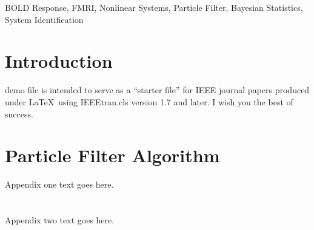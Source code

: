 \documentclass[journal]{./IEEEtran}
\begin{document}
\begin{IEEEkeywords}
BOLD Response, FMRI, Nonlinear Systems, Particle Filter, Bayesian Statistics, System Identification
\end{IEEEkeywords}

%
\IEEEpeerreviewmaketitle


\section{Introduction}
% 
% 
% 
% 
 demo file is intended to serve as a ``starter file''
for IEEE journal papers produced under \LaTeX\ using
IEEEtran.cls version 1.7 and later.
I wish you the best of success.

\appendices
\section{Particle Filter Algorithm}
Appendix one text goes here.

\section{}
Appendix two text goes here.





\end{document}
